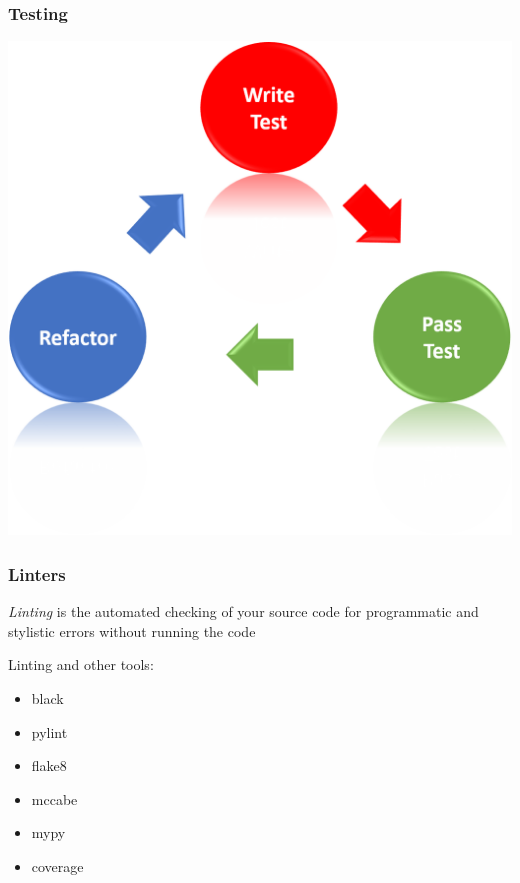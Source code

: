 \begin{frame}
    \frametitle{Testing}
    \centering
    \includegraphics[scale=0.2]{Bin/testing.png}
\end{frame}


\begin{frame}
    \frametitle{Linters}
    \centering

    \textit{Linting} is the automated checking of your source code for 
    programmatic and stylistic errors without running the code
    
    \vspace{1cm}

    Linting and other tools:
    
    \begin{multicols}{3}
        \begin{itemize}
            \item black
            \item pylint
            \item flake8
            \item mccabe
            \item mypy
            \item coverage
        \end{itemize}
    \end{multicols}
\end{frame}


